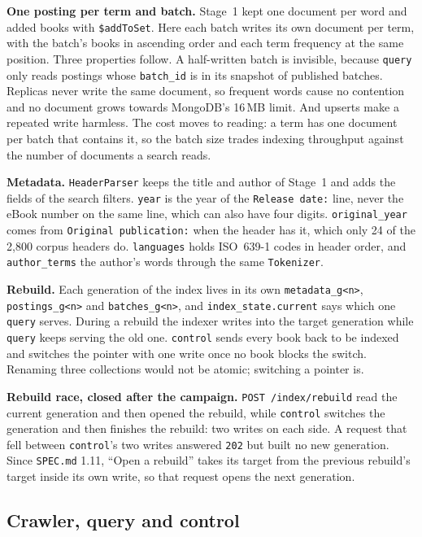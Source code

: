 \documentclass[11pt,a4paper]{article}
\newcommand{\code}[1]{\nolinkurl{#1}}
\begin{document}
\textbf{One posting per term and batch.} Stage~1 kept one document per word and added books with \code{$addToSet}.
Here each batch writes its own document per term, with the batch's books in ascending order and each term frequency at
the same position. Three properties follow. A half-written batch is invisible, because \code{query} only reads
postings whose \code{batch_id} is in its snapshot of published batches. Replicas never write the same document, so
frequent words cause no contention and no document grows towards MongoDB's 16\,MB limit. And upserts make a repeated
write harmless. The cost moves to reading: a term has one document per batch that contains it, so the batch size trades
indexing throughput against the number of documents a search reads.

\textbf{Metadata.} \code{HeaderParser} keeps the title and author of Stage~1 and adds the fields of the search
filters. \code{year} is the year of the \code{Release date:} line, never the eBook number on the same line, which can
also have four digits. \code{original_year} comes from \code{Original publication:} when the header has it, which only
24 of the 2{,}800 corpus headers do. \code{languages} holds ISO~639-1 codes in header order, and \code{author_terms} the
author's words through the same \code{Tokenizer}.

\textbf{Rebuild.} Each generation of the index lives in its own \code{metadata_g<n>}, \code{postings_g<n>} and
\code{batches_g<n>}, and \code{index_state.current} says which one \code{query} serves. During a rebuild the indexer
writes into the target generation while \code{query} keeps serving the old one. \code{control} sends every book back to
be indexed and switches the pointer with one write once no book blocks the switch. Renaming three collections would
not be atomic; switching a pointer is.

\textbf{Rebuild race, closed after the campaign.} \code{POST /index/rebuild} read the current generation and then
opened the rebuild, while \code{control} switches the generation and then finishes the rebuild: two writes on each
side. A request that fell between \code{control}'s two writes answered \code{202} but built no new generation. Since
\code{SPEC.md} 1.11, ``Open a rebuild'' takes its target from the previous rebuild's target inside its own write, so
that request opens the next generation.

\subsection{Crawler, query and control}
\end{document}
